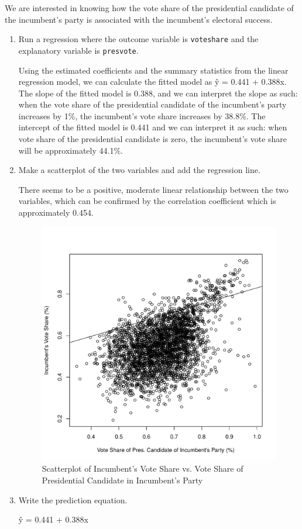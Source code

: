 \documentclass[12pt,letterpaper]{article}
\begin{document}
\noindent We are interested in knowing how the vote share of the presidential candidate of the incumbent's party is associated with the incumbent's electoral success.
	\vspace{.25cm}
	\begin{enumerate}
		\item Run a regression where the outcome variable is \texttt{voteshare} and the explanatory variable is \texttt{presvote}.
		
		 
		
		Using the estimated coefficients and the summary statistics from the linear regression model, we can calculate the fitted model as \^{y} = 0.441 + 0.388x. The slope of the fitted model is 0.388, and we can interpret the slope as such: when the vote share of the presidential candidate of the incumbent's party increases by 1\%, the incumbent's vote share increases by 38.8\%. The intercept of the fitted model is 0.441 and we can interpret it as such: when vote share of the presidential candidate is zero, the incumbent's vote share will be approximately 44.1\%.
				
		\item Make a scatterplot of the two variables and add the regression line. 
		
		
		
			There seems to be a positive, moderate linear relationship between the two variables, which can be confirmed by the correlation coefficient which is approximately 0.454.
		
		\begin{figure} [h]
			\centering
			\includegraphics[width=0.7\linewidth]{plotq3.pdf}
			\caption{Scatterplot of Incumbent's Vote Share vs. Vote Share of Presidential Candidate in Incumbent's Party}
			\label{fig:graph2}
		\end{figure}
	
		\newpage
		\item Write the prediction equation.
		
		\^{y} = 0.441 + 0.388x
	\end{enumerate}
	
\end{document}
